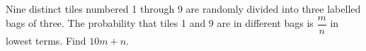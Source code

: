 Nine distinct tiles numbered 1 through 9 are randomly divided into three labelled bags of three. The probability that tiles 1 and 9 are in different bags is $\dfrac{m}{n}$ in lowest terms. Find $10m+n$.
